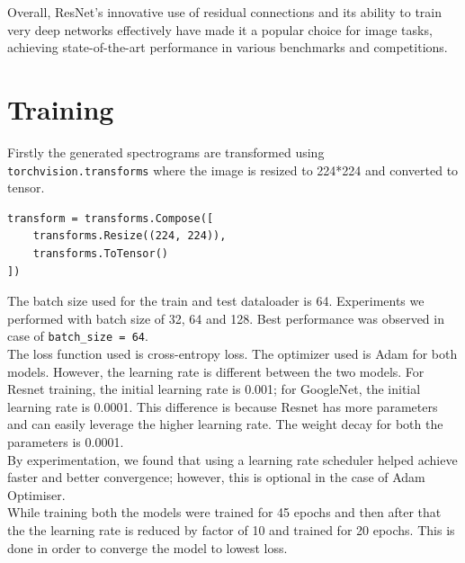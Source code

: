 \documentclass{article}
\begin{document}
Overall, ResNet's innovative use of residual connections and its ability to train very deep networks effectively have made it a popular choice for image tasks, achieving state-of-the-art performance in various benchmarks and competitions.
\section{Training}
Firstly the generated spectrograms are transformed using \texttt{torchvision.transforms} where the image is resized to 224*224 and converted to tensor.\\
\begin{lstlisting}
transform = transforms.Compose([
    transforms.Resize((224, 224)),
    transforms.ToTensor()
])
\end{lstlisting}

The batch size used for the train and test dataloader is 64. Experiments we performed with batch size of 32, 64 and 128. Best performance was observed in case of \texttt{batch\_size = 64}.\\

The loss function used is cross-entropy loss. The optimizer used is Adam for both models. However, the learning rate is different between the two models. For Resnet training, the initial learning rate is 0.001; for GoogleNet, the initial learning rate is 0.0001. This difference is because Resnet has more parameters and can easily leverage the higher learning rate. The weight decay for both the parameters is 0.0001.\\

By experimentation, we found that using a learning rate scheduler helped achieve faster and better convergence; however, this is optional in the case of Adam Optimiser.\\

While training both the models were trained for 45 epochs and then after that the the learning rate is reduced by factor of 10 and trained for 20 epochs. This is done in order to converge the model to lowest loss.\\
\end{document}

